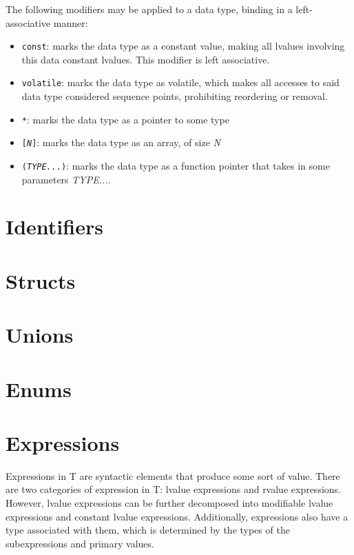 \documentclass[letterpaper,12pt]{book}
\begin{document}
The following modifiers may be applied to a data type, binding in a left-associative manner:

\begin{itemize}
	\item \texttt{const}: marks the data type as a constant value, making all lvalues involving this data constant lvalues. This modifier is left associative.
	\item \texttt{volatile}: marks the data type as volatile, which makes all accesses to said data type considered sequence points, prohibiting reordering or removal.
	\item \texttt{*}: marks the data type as a pointer to some type
	\item \texttt{[\textit{N}]}: marks the data type as an array, of size \textit{N}
	\item \texttt{(\textit{TYPE...})}: marks the data type as a function pointer that takes in some parameters \textit{TYPE...}.
\end{itemize}

\section{Identifiers}

\section{Structs}

\section{Unions}

\section{Enums}

\section{Expressions}

Expressions in T are syntactic elements that produce some sort of value. There are two categories of expression in T: lvalue expressions and rvalue expressions. However, lvalue expressions can be further decomposed into modifiable lvalue expressions and constant lvalue expressions. Additionally, expressions also have a type associated with them, which is determined by the types of the subexpressions and primary values.
\end{document}
